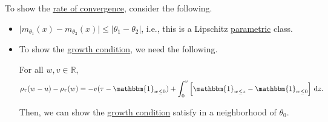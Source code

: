 \begin{explanation}
	To show the \hyperref[def:rate-of-convergence]{rate of convergence}, consider the following.

	\begin{itemize}
		\item \(\vert m_{\theta _1}(x) - m_{\theta _2}(x) \vert \leq \vert \theta _1 - \theta _2 \vert \), i.e., this is a Lipschitz \hyperref[def:parametric]{parametric} class.
		\item To show the \hyperref[def:growth-condition*]{growth condition}, we need the following.
		      \begin{lemma}
			      For all \(w, v\in \mathbb{R} \),
			      \[
				      \rho _\tau (w - u) - \rho _\tau (w) = - v(\tau - \mathbbm{1}_{w \leq 0} ) + \int_{0}^{v} \left[ \mathbbm{1}_{w \leq z} - \mathbbm{1}_{w \leq 0}  \right]  \,\mathrm{d}z .
			      \]
		      \end{lemma}

		      Then, we can show the \hyperref[def:growth-condition*]{growth condition} satisfy in a neighborhood of \(\theta _0\).


\end{itemize}
\end{explanation}
